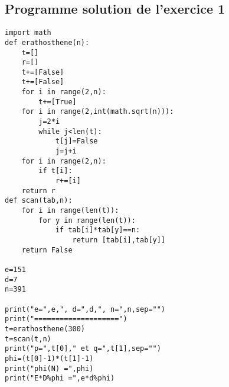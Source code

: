 \documentclass[10pt,a4paper,french]{article}
\newcounter{exercice}[section]
\begin{document}
\subsection{Programme solution de l'exercice 1}\label{exo1}
\begin{lstlisting}
import math
def erathosthene(n):
    t=[]
    r=[]
    t+=[False]
    t+=[False]
    for i in range(2,n):
        t+=[True]
    for i in range(2,int(math.sqrt(n))):
        j=2*i
        while j<len(t):
            t[j]=False
            j=j+i
    for i in range(2,n):
        if t[i]:
            r+=[i]
    return r
def scan(tab,n):
    for i in range(len(t)):
        for y in range(len(t)):
            if tab[i]*tab[y]==n:
                return [tab[i],tab[y]]
    return False

e=151
d=7
n=391

print("e=",e,", d=",d,", n=",n,sep="")
print("====================")
t=erathosthene(300)
t=scan(t,n)
print("p=",t[0]," et q=",t[1],sep="")
phi=(t[0]-1)*(t[1]-1)
print("phi(N) =",phi)
print("E*D%phi =",e*d%phi)
\end{lstlisting}
\end{document}

